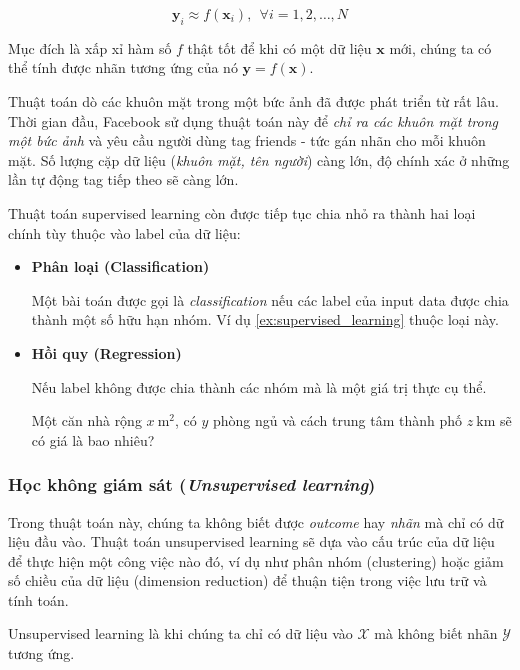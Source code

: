 \documentclass[../main-report.tex]{subfiles}
\begin{document}
\[ \mathbf{y}_i \approx f(\mathbf{x}_i), ~~ \forall i = 1, 2, \dots, N\] 

Mục đích là xấp xỉ hàm số \(f\) thật tốt để khi có một dữ liệu \(\mathbf{x}\) mới, chúng ta có thể tính được nhãn tương ứng của nó \( \mathbf{y} = f(\mathbf{x}) \).

\begin{example} \label{ex:supervised_learning}
Thuật toán dò các khuôn mặt trong một bức ảnh đã được phát triển từ rất lâu. Thời gian đầu, Facebook sử dụng thuật toán này để \emph{chỉ ra các khuôn mặt trong một bức ảnh} và yêu cầu người dùng tag friends - tức gán nhãn cho mỗi khuôn mặt. Số lượng cặp dữ liệu (\emph{khuôn mặt, tên người}) càng lớn, độ chính xác ở những lần tự động tag tiếp theo sẽ càng lớn.
\end{example}

Thuật toán supervised learning còn được tiếp tục chia nhỏ ra thành hai loại chính tùy thuộc vào label của dữ liệu:

\begin{itemize}
\item \textbf{Phân loại (Classification)}

Một bài toán được gọi là \emph{classification} nếu các label của input data được chia thành một số hữu hạn nhóm. Ví dụ \ref{ex:supervised_learning} thuộc loại này.

\item \textbf{Hồi quy (Regression)}

Nếu label không được chia thành các nhóm mà là một giá trị thực cụ thể.

\begin{example}
Một căn nhà rộng \(x ~ \text{m}^2\), có \(y\) phòng ngủ và cách trung tâm thành phố \(z~ \text{km}\) sẽ có giá là bao nhiêu?
\end{example}
\end{itemize}

\subsubsection*{Học không giám sát (\emph{Unsupervised learning})}
Trong thuật toán này, chúng ta không biết được \emph{outcome} hay \emph{nhãn} mà chỉ có dữ liệu đầu vào. Thuật toán unsupervised learning sẽ dựa vào cấu trúc của dữ liệu để thực hiện một công việc nào đó, ví dụ như phân nhóm (clustering) hoặc giảm số chiều của dữ liệu (dimension reduction) để thuận tiện trong việc lưu trữ và tính toán.

Unsupervised learning là khi chúng ta chỉ có dữ liệu vào \(\mathcal{X} \) mà không biết nhãn \(\mathcal{Y}\) tương ứng.
\end{document}
